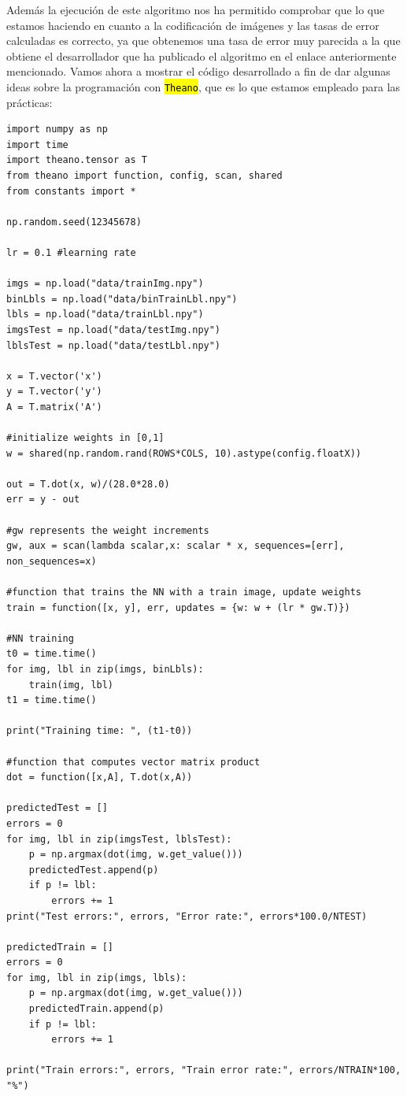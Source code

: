 \documentclass[10pt,a4paper]{article}
\newcommand{\code}[1]{\sethlcolor{light-gray}\hl{\texttt{#1}}} %
\begin{document}
Además la ejecución de este algoritmo nos ha permitido comprobar que lo que estamos haciendo en cuanto a la codificación de imágenes y las tasas de error calculadas es correcto, ya que obtenemos una tasa de error muy parecida a la que obtiene el desarrollador que ha publicado el algoritmo en el enlace anteriormente mencionado. Vamos ahora a mostrar el código desarrollado a fin de dar algunas ideas sobre la programación con \code{Theano}, que es lo que estamos empleado para las prácticas:\\

\begin{lstlisting}
import numpy as np
import time
import theano.tensor as T
from theano import function, config, scan, shared
from constants import *

np.random.seed(12345678)

lr = 0.1 #learning rate

imgs = np.load("data/trainImg.npy")
binLbls = np.load("data/binTrainLbl.npy")
lbls = np.load("data/trainLbl.npy")
imgsTest = np.load("data/testImg.npy")
lblsTest = np.load("data/testLbl.npy")

x = T.vector('x')
y = T.vector('y')
A = T.matrix('A')

#initialize weights in [0,1]
w = shared(np.random.rand(ROWS*COLS, 10).astype(config.floatX))

out = T.dot(x, w)/(28.0*28.0)
err = y - out

#gw represents the weight increments
gw, aux = scan(lambda scalar,x: scalar * x, sequences=[err], non_sequences=x)

#function that trains the NN with a train image, update weights
train = function([x, y], err, updates = {w: w + (lr * gw.T)})

#NN training
t0 = time.time()
for img, lbl in zip(imgs, binLbls):
    train(img, lbl)
t1 = time.time()

print("Training time: ", (t1-t0))

#function that computes vector matrix product
dot = function([x,A], T.dot(x,A))

predictedTest = []
errors = 0
for img, lbl in zip(imgsTest, lblsTest):
    p = np.argmax(dot(img, w.get_value()))
    predictedTest.append(p)
    if p != lbl:
        errors += 1
print("Test errors:", errors, "Error rate:", errors*100.0/NTEST)

predictedTrain = []
errors = 0
for img, lbl in zip(imgs, lbls):
    p = np.argmax(dot(img, w.get_value()))
    predictedTrain.append(p)
    if p != lbl:
        errors += 1

print("Train errors:", errors, "Train error rate:", errors/NTRAIN*100, "%")
\end{lstlisting}
\end{document}

